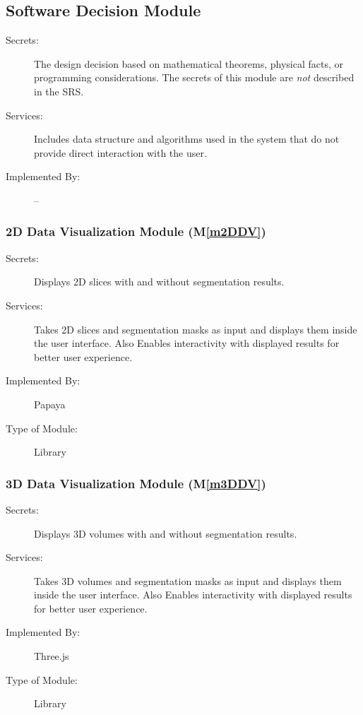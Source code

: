 \documentclass[12pt, titlepage]{article}
\newcommand{\mref}[1]{M\ref{#1}}
\begin{document}
\subsection{Software Decision Module}

\begin{description}
  \item[Secrets:] The design decision based on mathematical theorems, physical
        facts, or programming considerations. The secrets of this module are
        \emph{not} described in the SRS.
  \item[Services:] Includes data structure and algorithms used in the system that
        do not provide direct interaction with the user.
  \item[Implemented By:] --
\end{description}

\subsubsection{2D Data Visualization Module (\mref{m2DDV})}

\begin{description}
  \item[Secrets:]Displays 2D slices with and without segmentation results.
  \item[Services:] Takes 2D slices and segmentation masks as input and displays them inside
        the user interface. Also Enables interactivity with displayed results for better user experience.
  \item[Implemented By:] Papaya
  \item[Type of Module:] Library
\end{description}

\subsubsection{3D Data Visualization Module (\mref{m3DDV})}

\begin{description}
  \item[Secrets:]Displays 3D volumes with and without segmentation results.
  \item[Services:] Takes 3D volumes and segmentation masks as input and displays them inside
        the user interface. Also Enables interactivity with displayed results for better user experience.
  \item[Implemented By:] Three.js
  \item[Type of Module:] Library
\end{description}
\end{document}
